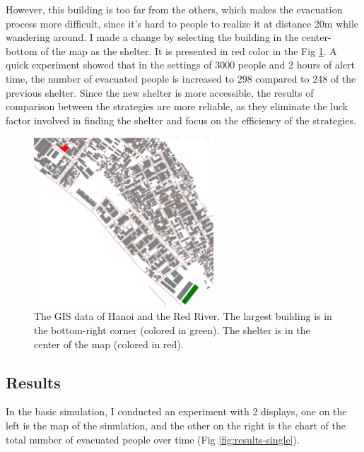 \documentclass[12pt]{article}
\begin{document}
However, this building is too far from the others, which makes the evacuation process more difficult, since it's hard to people to realize it at distance 20m while wandering around. I made a change by selecting the building in the center-bottom of the map as the shelter. It is presented in red color in the Fig \ref{fig:map}. A quick experiment showed that in the settings of 3000 people and 2 hours of alert time, the number of evacuated people is increased to 298 compared to 248 of the previous shelter. Since the new shelter is more accessible, the results of comparison between the strategies are more reliable, as they eliminate the luck factor involved in finding the shelter and focus on the efficiency of the strategies.\\

\begin{figure}
    \centering
    \includegraphics[width=0.6\textwidth]{../images/map0.png}
    \caption{The GIS data of Hanoi and the Red River. The largest building is in the bottom-right corner (colored in green). The shelter is in the center of the map (colored in red).}
    \label{fig:map}
\end{figure}

\subsection{Results}

In the basic simulation, I conducted an experiment with 2 displays, one on the left is the map of the simulation, and the other on the right is the chart of the total number of evacuated people over time (Fig \ref{fig:results-single}). \\
\end{document}
